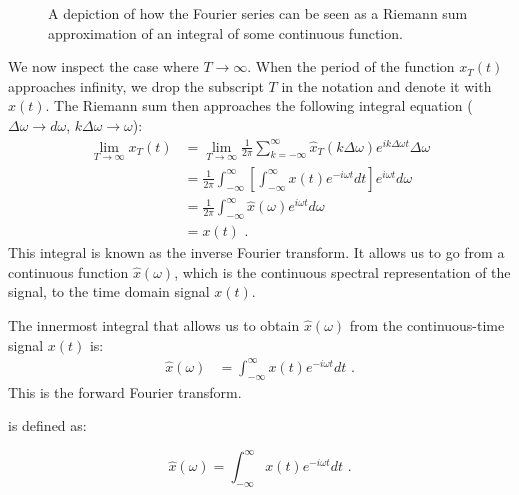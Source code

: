 \begin{figure}
\begin{center}
  \end{center}
  \caption{A depiction of how the Fourier series can be seen as a Riemann sum approximation of an integral of some continuous function.}
\end{figure}

We now inspect the case where $T\rightarrow \infty$. When the period of the
function $x_{T}(t)$ approaches infinity,
we drop the subscript $T$ in the notation and denote it with $x(t)$.
The Riemann sum then approaches the following integral
equation ($\Delta\omega \rightarrow d\omega$, $k\Delta\omega \rightarrow \omega$):
\begin{align}
  \lim_{T\rightarrow \infty} x_{T}(t) & = \lim_{T\rightarrow \infty}\frac{1}{2\pi} \sum_{k=-\infty}^{\infty} \hat{x}_{T}(k\Delta \omega) e^{ik\Delta \omega t}\Delta\omega \\
                                      & =\frac{1}{2\pi}\int_{-\infty}^{\infty} \left[\int_{-\infty}^{\infty} x(t) e^{-i\omega t} dt\right] e^{i\omega t}d\omega            \\
                                      & = \frac{1}{2\pi} \int_{-\infty}^{\infty} \hat{x}(\omega) e^{i\omega t}d\omega                                                      \\
                                      & = x(t) \,\,.
\end{align}
This integral is known as the inverse Fourier transform. It allows us to go from a continuous function $\hat{x}(\omega)$,
which is the continuous spectral representation of the signal, to the time domain signal $x(t)$.

The innermost integral that allows us to obtain $\hat{x}(\omega)$ from the continuous-time signal $x(t)$ is:
\begin{align}
  \hat{x}(\omega) & = \int_{-\infty}^{\infty} x(t) e^{-i\omega t} dt \,\,.
\end{align}
This is the forward Fourier transform.

 is defined as:

\begin{equation}
  \boxed{
    \hat{x}(\omega) = \int_{-\infty}^{\infty} x(t) e^{-i\omega t}dt
  } \,\,.
\end{equation}

